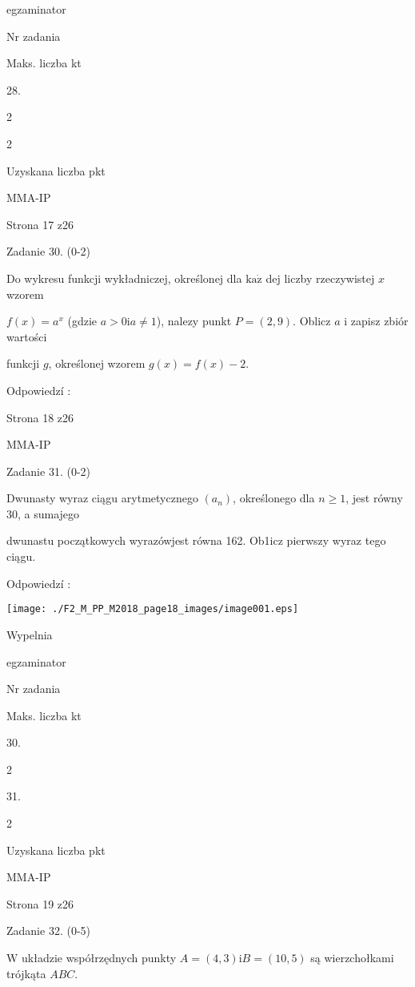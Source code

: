 \documentclass[a4paper,12pt]{article}
\begin{document}
egzaminator

Nr zadania

Maks. liczba kt

28.

2

2

Uzyskana liczba pkt

MMA-IP

Strona 17 z26





Zadanie 30. (0-2)

Do wykresu funkcji wykładniczej, określonej dla $\mathrm{k}\mathrm{a}\dot{\mathrm{z}}$ dej liczby rzeczywistej $x$ wzorem

$f(x)=a^{x}$ (gdzie $a>0 \mathrm{i} a\neq 1$), nalezy punkt $P=(2,9)$. Oblicz $a$ i zapisz zbiór wartości

funkcji $g$, określonej wzorem $g(x)=f(x)-2.$

Odpowiedzí :

Strona 18 z26

MMA-IP





Zadanie 31. (0-2)

Dwunasty wyraz ciągu arytmetycznego $(a_{n})$, określonego dla $n\geq 1$, jest równy 30, a sumajego

dwunastu początkowych wyrazówjest równa 162. Ob1icz pierwszy wyraz tego ciągu.

Odpowiedzí :
\begin{center}
\texttt{[image: ./F2\_M\_PP\_M2018\_page18\_images/image001.eps]}
\end{center}
Wypelnia

egzaminator

Nr zadania

Maks. liczba kt

30.

2

31.

2

Uzyskana liczba pkt

MMA-IP

Strona 19 z26





Zadanie 32. (0-5)

$\mathrm{W}$ układzie współrzędnych punkty $A=(4,3) \mathrm{i} B=(10,5)$ są wierzchołkami trójkąta $ABC.$
\end{document}
